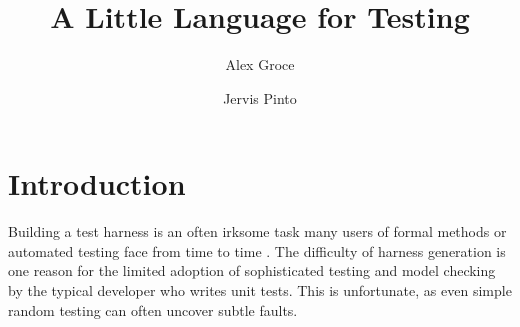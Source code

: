 \documentclass[runningheads,a4paper]{llncs}
\begin{document}
\mainmatter  %

\title{A Little Language for Testing}


%
%
\author{Alex Groce \and Jervis Pinto}
%


%
%

\maketitle


\begin{abstract}

\end{abstract}


\section{Introduction}

Building a test harness is an often irksome task many users of formal
methods or automated testing face from time to time
\cite{woda08,woda12}.  The difficulty of harness generation is one
reason for the limited adoption of sophisticated testing and model
checking by the typical developer who writes unit tests.  This is
unfortunate, as even simple random testing can often uncover subtle
faults.
\end{document}
